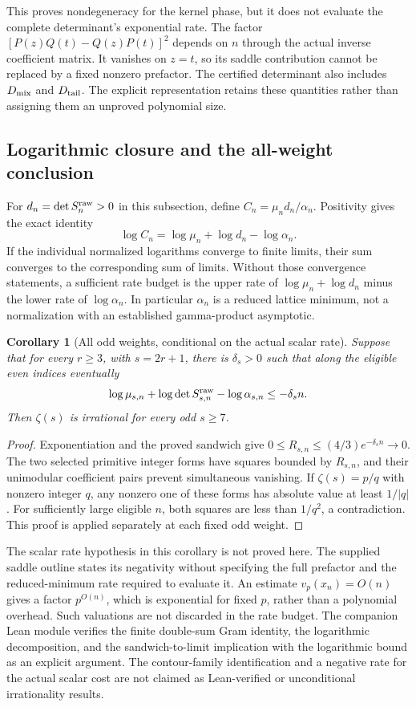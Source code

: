 \documentclass[11pt]{article}
\newtheorem{corollary}[theorem]{Corollary}
\theoremstyle{remark}
\begin{document}
This proves nondegeneracy for the kernel phase, but it does not evaluate
the complete determinant's exponential rate. The factor
\([P(z)Q(t)-Q(z)P(t)]^2\) depends on \(n\) through the actual inverse
coefficient matrix. It vanishes on \(z=t\), so its saddle contribution
cannot be replaced by a fixed nonzero prefactor. The certified determinant
also includes \(D_{\rm mix}\) and \(D_{\rm tail}\). The explicit
representation retains these quantities rather than assigning them
an unproved polynomial size.

\subsection{Logarithmic closure and the all-weight conclusion}
For \(d_n=\det S_n^{\rm raw}>0\) in this subsection, define
\(C_n=\mu_n d_n/\alpha_n\). Positivity gives the exact identity
\[
 \log C_n=\log\mu_n+\log d_n-\log\alpha_n.
\]
If the individual normalized logarithms converge to finite limits,
their sum converges to the corresponding sum of limits. Without those
convergence statements, a sufficient rate budget is the upper rate
of \(\log\mu_n+\log d_n\) minus the lower rate of \(\log\alpha_n\).
In particular \(\alpha_n\) is a reduced lattice minimum, not a
normalization with an established gamma-product asymptotic.

\begin{corollary}[All odd weights, conditional on the actual scalar rate]
Suppose that for every \(r\ge3\), with \(s=2r+1\), there is
\(\delta_s>0\) such that along the eligible even indices eventually
\[
 \log\mu_{s,n}+\log\det S_{s,n}^{\rm raw}
           -\log\alpha_{s,n}\le-\delta_s n.
\]
Then \(\zeta(s)\) is irrational for every odd \(s\ge7\).
\end{corollary}
\begin{proof}
Exponentiation and the proved sandwich give
\(0\le R_{s,n}\le(4/3)e^{-\delta_s n}\to0\).
The two selected primitive integer forms have squares bounded by
\(R_{s,n}\), and their unimodular coefficient pairs prevent simultaneous
vanishing. If \(\zeta(s)=p/q\) with nonzero integer \(q\), any nonzero
one of these forms has absolute value at least \(1/|q|\). For sufficiently
large eligible \(n\), both squares are less than \(1/q^2\), a contradiction.
This proof is applied separately at each fixed odd weight.
\end{proof}
The scalar rate hypothesis in this corollary is not proved here.
The supplied saddle outline states its negativity without specifying
the full prefactor and the reduced-minimum rate required to evaluate it.
An estimate \(v_p(x_n)=O(n)\) gives a factor \(p^{O(n)}\), which is
exponential for fixed \(p\), rather than a polynomial overhead.
Such valuations are not discarded in the rate budget.
The companion Lean module verifies the finite double-sum Gram identity,
the logarithmic decomposition, and the sandwich-to-limit implication
with the logarithmic bound as an explicit argument. The contour-family
identification and a negative rate for the actual scalar cost are not
claimed as Lean-verified or unconditional irrationality results.
\end{document}
